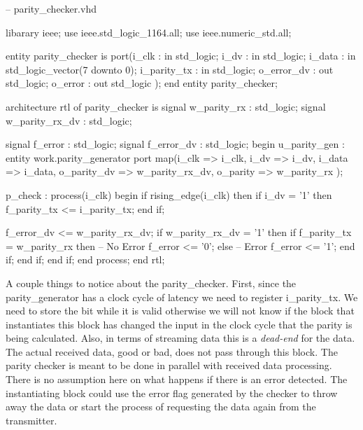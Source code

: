 \begin{VHDLlisting}[tabsize=4]
-- parity_checker.vhd

libarary ieee;
	use ieee.std_logic_1164.all;
	use ieee.numeric_std.all;
	
entity parity_checker is
    port(i_clk       : in    std_logic;
         i_dv        : in    std_logic;
         i_data      : in    std_logic_vector(7 downto 0);
         i_parity_tx : in    std_logic;
         o_error_dv  :   out std_logic;
         o_error     :   out std_logic
    );
end entity parity_checker;

architecture rtl of parity_checker is
    signal w_parity_rx    : std_logic;
    signal w_parity_rx_dv : std_logic;
    
    signal f_error        : std_logic;
    signal f_error_dv     : std_logic;
begin
    u_parity_gen : entity work.parity_generator
    port map(i_clk          => i_clk,
             i_dv           => i_dv,
             i_data         => i_data,
             o_parity_dv    => w_parity_rx_dv,
             o_parity       => w_parity_rx
    );
    
    p_check : process(i_clk)
    begin
        if rising_edge(i_clk) then
            if i_dv = '1' then	
                f_parity_tx <= i_parity_tx;
            end if;
            
            f_error_dv <= w_parity_rx_dv;
            if w_parity_rx_dv = '1' then
                if f_parity_tx = w_parity_rx then
                    -- No Error
                    f_error <= '0';
                else
                    -- Error
                    f_error <= '1';
                end if;			
            end if;
        end if;	
    end process;
end rtl;
\end{VHDLlisting}

A couple things to notice about the parity\_checker. First, since the parity\_generator has a clock cycle of latency we need to register i\_parity\_tx. We need to store the bit while it is valid otherwise we will not know if the block that instantiates this block has changed the input in the clock cycle that the parity is being calculated. Also, in terms of streaming data this is a \emph{dead-end} for the data. The actual received data, good or bad, does not pass through this block. The parity checker is meant to be done in parallel with received data processing. There is no assumption here on what happens if there is an error detected. The instantiating block could use the error flag generated by the checker to throw away the data or start the process of requesting the data again from the transmitter. 


